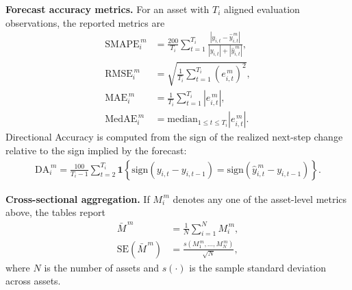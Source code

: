 ﻿\documentclass[11pt,a4paper]{article}
\begin{document}
\vspace{0.15cm}
\noindent \textbf{Forecast accuracy metrics.}
For an asset with $T_i$ aligned evaluation observations, the reported metrics are
\begin{align*}
\mathrm{SMAPE}^{\,m}_i &= \frac{200}{T_i}\sum_{t=1}^{T_i}\frac{|y_{i,t}-\hat{y}^{\,m}_{i,t}|}{|y_{i,t}|+|\hat{y}^{\,m}_{i,t}|},\\
\mathrm{RMSE}^{\,m}_i &= \sqrt{\frac{1}{T_i}\sum_{t=1}^{T_i}\left(e^{\,m}_{i,t}\right)^2},\\
\mathrm{MAE}^{\,m}_i &= \frac{1}{T_i}\sum_{t=1}^{T_i}\left|e^{\,m}_{i,t}\right|,\\
\mathrm{MedAE}^{\,m}_i &= \mathrm{median}_{1 \leq t \leq T_i}\left|e^{\,m}_{i,t}\right|.
\end{align*}
Directional Accuracy is computed from the sign of the realized next-step change relative to the sign implied by the forecast:
\begin{align*}
\mathrm{DA}^{\,m}_i
= \frac{100}{T_i-1}\sum_{t=2}^{T_i}
\mathbf{1}\!\left\{
\mathrm{sign}(y_{i,t}-y_{i,t-1})
=
\mathrm{sign}(\hat{y}^{\,m}_{i,t}-y_{i,t-1})
\right\}.
\end{align*}

\vspace{0.15cm}
\noindent \textbf{Cross-sectional aggregation.}
If $M_i^{\,m}$ denotes any one of the asset-level metrics above, the tables report
\begin{align*}
\bar{M}^{\,m} &= \frac{1}{N}\sum_{i=1}^{N} M_i^{\,m},\\
\mathrm{SE}\!\left(\bar{M}^{\,m}\right) &= \frac{s(M_1^{\,m},\ldots,M_N^{\,m})}{\sqrt{N}},
\end{align*}
where $N$ is the number of assets and $s(\cdot)$ is the sample standard deviation across assets.
\end{document}
